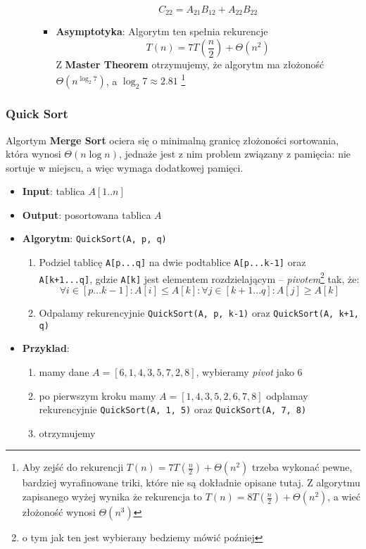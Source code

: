 \documentclass[11pt,a4paper]{article}
\begin{document}
\begin{itemize}
\begin{enumerate}
\begin{itemize}
\[                        \]
                        \[
                            C_{22} = A_{21}B_{12} + A_{22}B_{22}
                        \]
                    \item \textbf{Asymptotyka}: Algorytm ten spełnia rekurencje
                        \[
                            T(n) = 7T(\frac{n}{2}) + \Theta(n^2)
                        \]
                        Z \textbf{Master Theorem} otrzymujemy, że algorytm ma złożoność $\Theta(n^{\log_2 7})$, a $\log_2 7 \approx 2.81$
                        \footnote{Aby zejść do rekurencji $T(n) = 7T(\frac{n}{2}) + \Theta(n^2)$ trzeba wykonać pewne, bardziej wyrafinowane triki, które nie są dokładnie opisane tutaj. Z algorytmu zapisanego wyżej wynika że rekurencja to $T(n) = 8T(\frac{n}{2}) + \Theta(n^2)$, a wieć złożoność wynosi $\Theta(n^3)$}
                \end{itemize}
        \end{enumerate}
\end{itemize}

\subsubsection{Quick Sort}
Algortym \textbf{Merge Sort} ociera się o minimalną granicę złożoności sortowania, która wynosi $\Theta(n \log n)$, jednaże jest z nim problem związany z pamięcia: nie sortuje w miejscu, a więc wymaga dodatkowej pamięci.
\begin{itemize}
    \item \textbf{Input}: tablica $A[1..n]$
    \item \textbf{Output}: posortowana tablica $A$
    \item \textbf{Algorytm}: \texttt{QuickSort(A, p, q)}
        \begin{enumerate}
            \item Podziel tablicę \texttt{A[p...q]} na dwie podtablice \texttt{A[p...k-1]} oraz \texttt{A[k+1...q]}, gdzie \texttt{A[k]} jest elementem rozdzielającym -- \textit{pivotem}\footnote{o tym jak ten  jest wybierany bedziemy mówić poźniej} tak, że:
                \[
                    \forall i \in [p...k-1]: A[i] \leq A[k]: \forall j \in [k+1...q]: A[j] \geq A[k]
                \]
            \item Odpalamy rekurencyjnie \texttt{QuickSort(A, p, k-1)} oraz \texttt{QuickSort(A, k+1, q)}
        \end{enumerate}
    \item \textbf{Przyklad}:
        \begin{enumerate}
            \item mamy dane $A = [6,1,4,3,5,7,2,8]$, wybieramy \textit{pivot} jako $6$
            \item po pierwszym kroku mamy $A = [1,4,3,5,2,6,7,8]$ odplamay rekurencyjnie \texttt{QuickSort(A, 1, 5)} oraz \texttt{QuickSort(A, 7, 8)}
            \item otrzymujemy %

        \end{enumerate}
\end{itemize}
\end{document}
